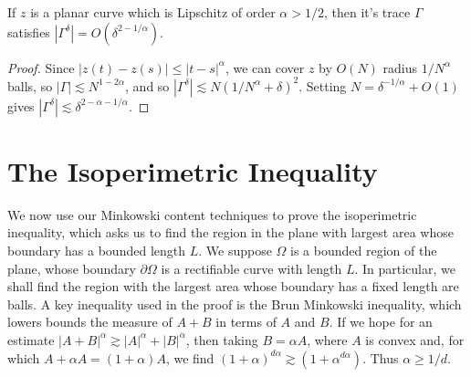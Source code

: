\begin{theorem}
  If $z$ is a planar curve which is Lipschitz of order $\alpha > 1/2$, then it's trace $\Gamma$ satisfies $|\Gamma^\delta| = O(\delta^{2-1/\alpha})$. 
\end{theorem}
\begin{proof}
  Since $|z(t) - z(s)| \leq |t - s|^\alpha$, we can cover $z$ by $O(N)$ radius $1/N^\alpha$ balls, so $|\Gamma| \lesssim N^{1-2\alpha}$, and so $|\Gamma^\delta| \lesssim N (1/N^\alpha + \delta)^2$. Setting $N = \delta^{-1/\alpha} + O(1)$ gives $|\Gamma^\delta| \lesssim \delta^{2-\alpha - 1/\alpha}$.
\end{proof}

\section{The Isoperimetric Inequality}

We now use our Minkowski content techniques to prove the isoperimetric inequality, which asks us to find the region in the plane with largest area whose boundary has a bounded length $L$. We suppose $\Omega$ is a bounded region of the plane, whose boundary $\partial \Omega$ is a rectifiable curve with length $L$. In particular, we shall find the region with the largest area whose boundary has a fixed length are balls. A key inequality used in the proof is the Brun Minkowski inequality, which lowers bounds the measure of $A+B$ in terms of $A$ and $B$. If we hope for an estimate $|A+B|^\alpha \gtrsim |A|^\alpha + |B|^\alpha$, then taking $B = \alpha A$, where $A$ is convex and, for which $A + \alpha A = (1 + \alpha)A$, we find $(1 + \alpha)^{d\alpha} \gtrsim (1 + \alpha^{d\alpha})$. Thus $\alpha \geq 1/d$.

